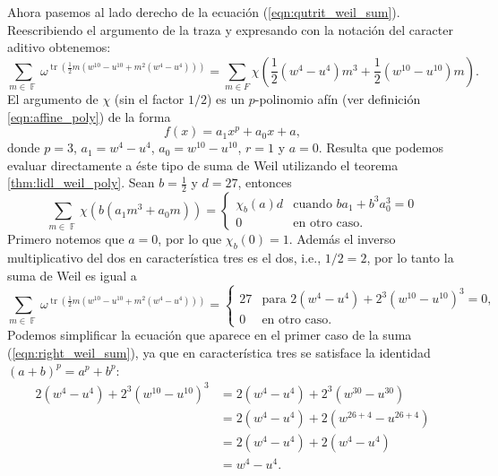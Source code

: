 \documentclass[a4paper,11pt]{report}
\DeclareMathOperator{\F}{\mathbb{F}}
\DeclareMathOperator{\tr}{tr}
\begin{document}
  Ahora pasemos al lado derecho de la ecuación
  (\ref{eqn:qutrit_weil_sum}). Reescribiendo el argumento de
  la traza y expresando con la notación del caracter aditivo
  obtenemos:
  \begin{equation}
    \sum_{m \in \F}^{} \omega^{\tr\left( \frac{1}{2} m\left(
    w^{10}-u^{10} + m^2(w^{4}-u^{4})\right)  \right) }
    = 
    \sum_{m \in F}^{} \chi\left(
      \frac{1}{2}
      \left( w^{4} - u^{4} \right) m^3
      + \frac{1}{2}
      \left( w^{10} - u^{10} \right) m 
    \right).
  \end{equation}
  El argumento de $\chi$ (sin el factor $1 / 2$) es un
  $p$-polinomio afín (ver definición \ref{eqn:affine_poly})
  de la forma
  \begin{equation}
    f(x) = a_1 x^{p} + a_0 x + a,
  \end{equation}
  donde $p = 3$, $a_1 = w^{4} - u^{4}$,  $a_0 = w^{10} -
  u^{10}$, $r = 1$ y $a = 0$. Resulta que podemos evaluar
  directamente a éste tipo de suma de Weil utilizando el
  teorema \ref{thm:lidl_weil_poly}. Sean $b = \frac{1}{2}$ y
  $d = 27$, entonces
  \begin{equation}
    \sum_{m \in \F}^{} \chi\left(
      b \left(
        a_1 m^{3} + a_0 m
      \right)
    \right)
    = 
    \begin{cases}
      \chi_{b}(a) d & \text{cuando } b a_1 + b^{3} a_0^{3} =
      0 \\
      0 & \text{en otro caso}.
    \end{cases}
  \end{equation}
  Primero notemos que $a = 0$, por lo que $\chi_b(0) = 1$.
  Además el inverso multiplicativo del dos en característica
  tres es el dos, i.e., $1 / 2 = 2$, por lo tanto la suma de
  Weil es igual a
  \begin{equation}
    \label{eqn:right_weil_sum}
    \sum_{m \in \F}^{} \omega^{\tr\left( \frac{1}{2} m\left(
    w^{10}-u^{10} + m^2(w^{4}-u^{4})\right)  \right) }
    =
    \begin{cases}
      27 & \text{para } 2\left( w^{4}-u^{4} \right) +
      2^{3} \left( w^{10} - u^{10} \right)^{3} = 0, \\
      0 & \text{en otro caso}.
    \end{cases}
  \end{equation}
  Podemos simplificar la ecuación que aparece en el primer
  caso de la suma (\ref{eqn:right_weil_sum}), ya que en
  característica tres se satisface la identidad $(a+b)^{p} =
  a^{p} + b^{p}$:
  \begin{align}
    2\left( w^{4}-u^{4} \right) + 2^{3} \left( w^{10} -
    u^{10} \right) ^{3}
    &= 2 \left(w^{4} - u^{4}\right) + 2^{3} \left( w^{30}
    - u^{30} \right) \\
    &= 2\left(w^{4} - u^{4}\right) + 2\left(w^{26 + 4} -
      u^{26 + 4}\right) \\
    &= 2\left(w^{4} - u^{4}\right) + 2\left(w^{4} -
    u^{4}\right) \\
    &= w^{4} - u^{4}.
  \end{align}
\end{document}
